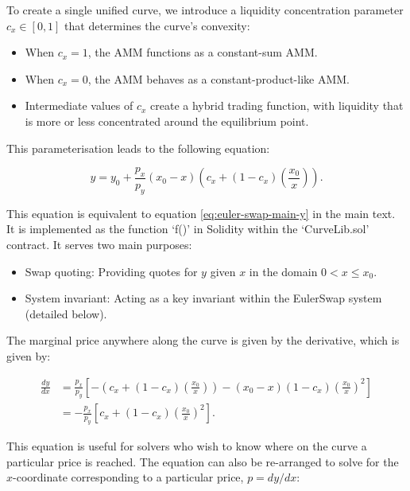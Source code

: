 \documentclass{article}
\begin{document}
To create a single unified curve, we introduce a liquidity concentration parameter \( c_x \in [0, 1] \) that determines the curve's convexity:

\begin{itemize}
    \item When \( c_x = 1 \), the AMM functions as a constant-sum AMM.
    \item When \( c_x = 0 \), the AMM behaves as a constant-product-like AMM.
    \item Intermediate values of \( c_x \) create a hybrid trading function, with liquidity that is more or less concentrated around the equilibrium point.
\end{itemize}

This parameterisation leads to the following equation:

\begin{equation}
    \label{eq:EulerSwap-1}
    y = y_0 + \frac{p_x}{p_y} (x_0 - x) \left( c_x + (1 - c_x) \left(\frac{x_0}{x}\right) \right).
\end{equation}

This equation is equivalent to equation \eqref{eq:euler-swap-main-y} in the main text. It is implemented as the function `f()' in Solidity within the `CurveLib.sol' contract. It serves two main purposes:

\begin{itemize}
    \item Swap quoting: Providing quotes for \(y\) given \(x\) in the domain \(0 < x \leq x_0\).
    \item System invariant: Acting as a key invariant within the EulerSwap system (detailed below).
\end{itemize}

The marginal price anywhere along the curve is given by the derivative, which is given by:

\begin{align}
    \frac{dy}{dx}
    &=
    \frac{p_x}{p_y} \left[ -\left( c_x + (1 - c_x) \left( \frac{x_0}{x} \right) \right) - (x_0 - x) (1 - c_x) \left( \frac{x_0}{x} \right)^2 \right] \\ \nonumber
    &=
    -\frac{p_x}{p_y} \left[ c_x + (1 - c_x) \left( \frac{x_0}{x} \right)^2 \right].
\end{align}

This equation is useful for solvers who wish to know where on the curve a particular price is reached. The equation can also be re-arranged to solve for the $x$-coordinate corresponding to a particular price, $p = dy / dx$:
\end{document}
